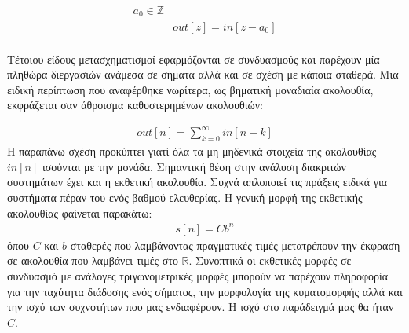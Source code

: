 \documentclass[breaklines=true, 12pt]{article}
\begin{document}
\begin{equation}
\begin{align}
a_{0} \in \mathbb{Z} \\
&out[z] = in[z-a_{0}] \\
\end{align}
\end{equation}

Τέτοιου είδους μετασχηματισμοί εφαρμόζονται σε συνδυασμούς και παρέχουν μία
πληθώρα διεργασιών ανάμεσα σε σήματα αλλά και σε σχέση με κάποια σταθερά.
Μια ειδική περίπτωση που αναφέρθηκε νωρίτερα, ως βηματική μοναδιαία
ακολουθία, εκφράζεται σαν άθροισμα καθυστερημένων ακολουθιών:

\begin{equation}
\begin{align}
out[n] = \sum_{k=0}^{\infty} in[n-k]
\end{align}
\end{equation}
Η παραπάνω σχέση προκύπτει γιατί όλα τα μη μηδενικά στοιχεία της ακολουθίας
\(in[n]\) ισούνται με την μονάδα. Σημαντική θέση στην ανάλυση διακριτών συστημάτων
έχει και η εκθετική ακολουθία. Συχνά απλοποιεί τις πράξεις ειδικά για
συστήματα πέραν του ενός βαθμού ελευθερίας. Η γενική μορφή της εκθετικής
ακολουθίας φαίνεται παρακάτω:
\begin{equation}
\begin{align}
s[n] = Cb^{n}
\end{align}
\end{equation}
όπου \(C\) και \(b\) σταθερές που λαμβάνοντας πραγματικές τιμές
μετατρέπουν την έκφραση σε ακολουθία που λαμβάνει τιμές στο \(\mathbb{R}\).
Συνοπτικά οι εκθετικές μορφές σε συνδυασμό με ανάλογες τριγωνομετρικές
μορφές μπορούν να παρέχουν πληροφορία για την ταχύτητα διάδοσης ενός
σήματος, την μορφολογία της κυματομορφής αλλά και την ισχύ των συχνοτήτων
που μας ενδιαφέρουν. Η ισχύ στο παράδειγμά μας θα ήταν \(C\).
\end{document}
